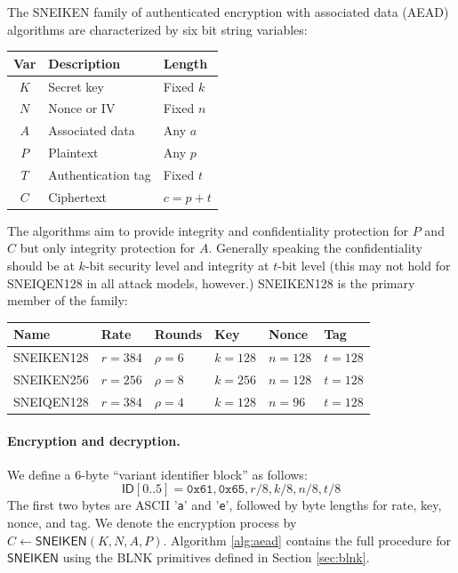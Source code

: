 \documentclass{iacrtrans}
\newcommand{\msf}[1]{\mathsf{#1}}
\newcommand{\mtt}[1]{\mathtt{#1}}
\begin{document}
	The SNEIKEN family of authenticated encryption with associated data (AEAD) 
	algorithms are characterized by six bit string variables:
	\begin{center}
	\begin{tabular}{c l l}
		{\bf Var} & {\bf Description} & {\bf Length} \\
		\hline
		$K$ & Secret key			& Fixed $k$	\\
		$N$ & Nonce or IV			& Fixed $n$	\\
		$A$ & Associated data		& Any $a$ \\
		$P$ & Plaintext				& Any $p$ \\
		$T$ & Authentication tag	& Fixed $t$ \\
		$C$ & Ciphertext			& $c=p+t$ \\
	\end{tabular}
	\end{center}
	The algorithms aim to provide integrity and confidentiality protection
	for $P$ and $C$ but only integrity protection for $A$. Generally
	speaking the confidentiality should be at $k$-bit security level and
	integrity at $t$-bit level (this may not hold for SNEIQEN128 in all
	attack models, however.) SNEIKEN128 is the primary member of the family:
	\begin{center}
	\begin{tabular}{x{25mm} x{15mm}  x{15mm} x{15mm} x{15mm} x{15mm}}
		{\bf Name} & {\bf Rate} & {\bf Rounds} & {\bf Key} & {\bf Nonce} 
			& {\bf Tag}  \\
		\hline
		SNEIKEN128 & $r=384$ & $\rho=6$ & $k=128$ & $n=128$ & $t=128$ \\
		SNEIKEN256 & $r=256$ & $\rho=8$ & $k=256$ & $n=128$ & $t=128$ \\
		SNEIQEN128 & $r=384$ & $\rho=4$ & $k=128$ & $n=96$  & $t=128$ \\
	\end{tabular}
	\end{center}

	\paragraph{Encryption and decryption.}
	We define a 6-byte ``variant identifier block'' as follows:
	\begin{equation}
		\msf{ID}[0..5] = \mtt{0x61}, \mtt{0x65}, 
			r / 8, k / 8, n / 8, t / 8
	\end{equation}
	The first two bytes are ASCII '{\tt a}' and '{\tt e}', followed
	by byte lengths for rate, key, nonce, and tag. 
	We denote the encryption process by $C \gets \msf{SNEIKEN}(K, N, A, P)$.
	Algorithm \ref{alg:aead} contains the full procedure for $\msf{SNEIKEN}$ using 
	the BLNK primitives defined in Section \ref{sec:blnk}.
\end{document}
